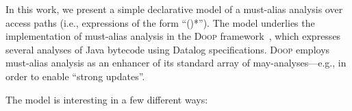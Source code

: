 



In this work, we present a simple declarative model of a must-alias
analysis over access paths (i.e., expressions of the form
``()*'').  The model underlies the implementation
of must-alias analysis in the \textsc{Doop}
framework~\cite{oopsla/BravenboerS09}, which expresses several
analyses of Java bytecode using Datalog specifications. \textsc{Doop}
employs must-alias analysis as an enhancer of its standard array of
may-analyses---e.g., in order to enable ``strong updates''.

The model is interesting in a few different ways:

